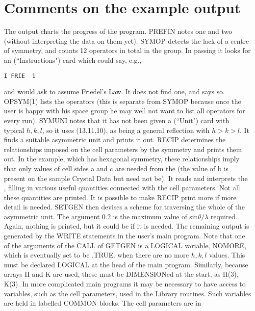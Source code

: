 {\section{Comments on the example output}
The output charts the progress of the program.  PREFIN notes one  
and two  (without interpreting the data on them yet).  SYMOP
detects the lack of a centre of symmetry, and counts 12 operators in
total in the group.  In passing it looks for an  (``Instructions") card
which could say, e.g.,
\pn\begin{verbatim}
I FRIE  1
\end{verbatim}\rm 
\par 
and would ask to assume Friedel's Law.  It does not find one, and says so.
\pn 
OPSYM(1) lists the operators (this is separate from SYMOP because once
the user is happy with his space group he may well not want to list all
operators for every run).
\pn 
SYMUNI notes that it has not been given a  (``Unit") card with typical
$h,k,l$, so it uses (13,11,10), as being a general reflection with
$h > k > l$.  It finds a suitable asymmetric unit and prints it out.
\pn 
RECIP determines the relationships
imposed on the cell parameters by the symmetry and prints them out.  
In the example, which has hexagonal symmetry, these relationships imply that 
only values of cell sides a and c are needed from the  (the value of b
is present on the sample Crystal Data but need not be).  It reads and
interprets the , filling in various useful quantities connected
with the cell parameters. Not all these quantities are printed.  It is
possible to make RECIP print more if more detail is needed.
\pn 
SETGEN then devises a scheme for traversing the whole of the asymmetric
unit.  The argument 0.2 is the maximum value of sin$\theta/\lambda$
required. Again, nothing is printed, but it could be if it is needed.
\pn 
The remaining output is generated by the WRITE statements in the user's
main program.
\pn 
Note that one of the arguments of the CALL of GETGEN is a LOGICAL
variable, NOMORE, which is eventually set to be .TRUE. when there are
no more $h,k,l$ values.  This must be declared LOGICAL at the head of
the main program.  Similarly, because arrays H and K are used, these
must be DIMENSIONed at the start, as H(3), K(3).
\pn 
In more complicated main programs it may be necessary to have access to
variables, such as the cell parameters, used in the Library routines.  Such
variables are held in labelled COMMON blocks.  The cell parameters are in
\pn\ttfamily\begin{verbatim}

\end{verbatim}}
